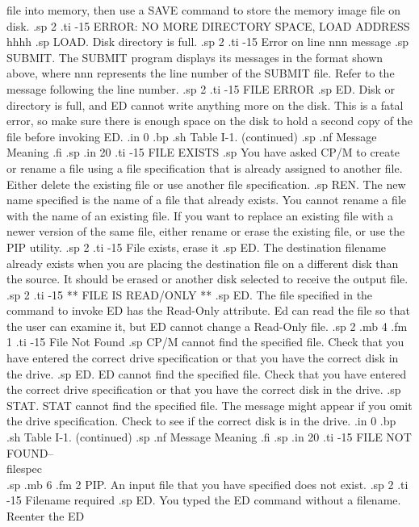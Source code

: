 file into memory, then use a SAVE command to store the memory 
image file on disk.
.sp 2
.ti -15
ERROR: NO MORE DIRECTORY SPACE, LOAD ADDRESS hhhh
.sp
LOAD.  Disk directory is full.
.sp 2
.ti -15
Error on line nnn message
.sp
SUBMIT.  The SUBMIT program displays its messages in the format 
shown above, where nnn represents the line number of the SUBMIT 
file.  Refer to the message following the line number.
.sp 2
.ti -15
FILE ERROR
.sp
ED.  Disk or directory is full, and ED cannot write anything more 
on the disk.  This is a fatal error, so make sure there is enough 
space on the disk to hold a second copy of the file before 
invoking ED.
.in 0
.bp
.sh
                     Table I-1.  (continued)
.sp
.nf
     Message        Meaning
.fi
.sp
.in 20
.ti -15
FILE EXISTS
.sp
You have asked CP/M to create or rename a file using a file 
specification that is already assigned to another file.  Either 
delete the existing file or use another file specification.
.sp
REN.  The new name specified is the name of a file that already 
exists.  You cannot rename a file with the name of an existing 
file.  If you want to replace an existing file with a newer 
version of the same file, either rename or erase the existing 
file, or use the PIP utility.
.sp 2
.ti -15
File exists, erase it
.sp
ED.  The destination filename already exists when you are placing 
the destination file on a different disk than the source.  It 
should be erased or another disk selected to receive the output 
file.
.sp 2
.ti -15
** FILE IS READ/ONLY **
.sp
ED.  The file specified in the command to invoke ED has the
Read-Only attribute.  Ed can read the file so that the user can 
examine it, but ED cannot change a Read-Only file.
.sp 2
.mb 4
.fm 1
.ti -15
File Not Found
.sp
CP/M cannot find the specified file.  Check that you have entered 
the correct drive specification or that you have the correct disk 
in the drive.
.sp
ED.  ED cannot find the specified file.  Check that you have 
entered the correct drive specification or that you have the 
correct disk in the drive.
.sp
STAT.  STAT cannot find the specified file.  The message might 
appear if you omit the drive specification.  Check to see if the 
correct disk is in the drive.
.in 0
.bp
.sh
                     Table I-1.  (continued)
.sp
.nf
     Message        Meaning
.fi
.sp
.in 20
.ti -15
FILE NOT FOUND--\\{filespec\\}
.sp
.mb 6
.fm 2
PIP.  An input file that you have specified does not exist.
.sp 2
.ti -15
Filename required
.sp
ED.  You typed the ED command without a filename.  Reenter the ED 
